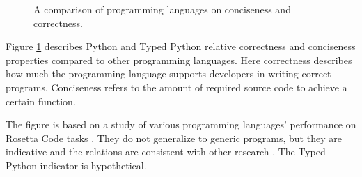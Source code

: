 \begin{figure}[ht]
    \centering
    \caption{A comparison of programming languages on conciseness and correctness.}
    \label{fig:language_comparison}
\end{figure}

Figure \ref{fig:language_comparison} describes Python and Typed Python relative correctness and conciseness properties compared to other programming languages. Here correctness describes how much the programming language supports developers in writing correct programs. Conciseness refers to the amount of required source code to achieve a certain function.

The figure is based on a study of various programming languages' performance on Rosetta Code tasks \cite{nanz_comparative_2015}. They do not generalize to generic programs, but they are indicative and the relations are consistent with other research \cite{ray_codequality_2014}. The Typed Python indicator is hypothetical.
